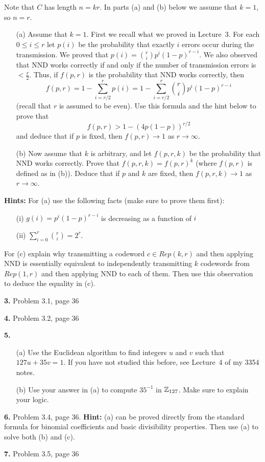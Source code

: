 \documentclass[12pt]{amsart}
\begin{document}
Note that $C$ has length $n=kr$. In parts (a) and (b) below we assume that $k=1$, so $n=r$.
\begin{itemize}
\item[(a)] Assume that $k=1$. First we recall what we proved in Lecture~3.
For each $0\leq i\leq r$ let $p(i)$ be the probability that exactly $i$ errors occur during the transmission. 
We proved that 
$p(i)={r\choose i} p^i (1-p)^{r-i}$. We also observed that NND works correctly
if and only if the number of transmission errors is $<\frac{r}{2}$. Thus, if
$f(p,r)$ is the probability that NND works correctly, then
$$f(p,r)=1-\sum\limits_{i=r/2}^r p(i)=1-\sum\limits_{i=r/2}^r {r\choose i} p^i (1-p)^{r-i}$$
(recall that $r$ is assumed to be even).
Use this formula and the hint below to prove that $$f(p,r)>1-(4p(1-p))^{r/2}$$ and deduce that if $p$ is fixed,
then $f(p,r)\to 1$ as $r\to\infty$. 
\item[(b)] Now assume that $k$ is arbitrary, and let $f(p,r,k)$ be the probability
that NND works correctly. Prove that $f(p,r,k)=f(p,r)^k$ (where $f(p,r)$ is defined as in (b)). Deduce that if $p$ and $k$ are fixed, then $f(p,r,k)\to 1$ as $r\to\infty$.
\end{itemize}
{\bf Hints:} For (a) use the following facts (make sure to prove them first):
\begin{itemize}
\item[(i)] $g(i)=p^i (1-p)^{r-i}$ is decreasing as a function of $i$
\item[(ii)] $\sum\limits_{i=0}^r {r\choose i}=2^r$.
\end{itemize}
For (c) explain why transmitting a codeword $c\in Rep(k,r)$ and then applying NND is essentially equivalent to independently transmitting $k$ codewords from $Rep(1,r)$ and then applying NND to each of them. Then use this observation to deduce the equality in (c).

{\bf 3.} Problem 3.1, page 36

{\bf 4.} Problem 3.2, page 36

{\bf 5.} 
\begin{itemize}
\item[(a)] Use the Euclidean algorithm to find integers $u$ and $v$ such that $127u+35v=1$. If you have not studied this before, see Lecture~4 of my 3354 notes.
\item[(b)] Use your answer in (a) to compute $35^{-1}$ in ${\mathbb Z}_{127}$. Make sure to explain your logic.
\end{itemize}

{\bf 6.} Problem 3.4, page 36. {\bf Hint:} (a) can be proved directly from the standard formula for binomial coefficients and
basic divisibility properties. Then use (a) to solve both (b) and (c).

{\bf 7.} Problem 3.5, page 36
\end{document}
